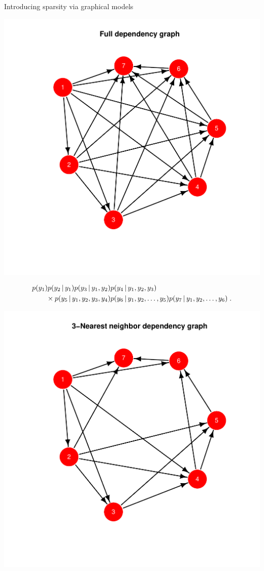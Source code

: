 \begin{frame}{Introducing sparsity via graphical models}
	
	 	{\begin{center}
	\includegraphics[scale=0.35, trim={0 1cm 1cm 2cm}, clip]{../figures/nnfull.pdf}
\end{center}
	{\small
	\begin{align*}
	& p(y_1)p(y_2\,|\, y_1)p(y_3\,|\, y_1,y_2)p(y_4\,|\, y_1,y_2,y_3)\\ 
	&\qquad \times p(y_5\,|\, y_1,y_2,y_3,y_4)p(y_6\,|\, y_1,y_2,\ldots,y_5)  p(y_7\,|\, y_1,y_2,\ldots,y_6)\;. 
	\end{align*}
}}
	 	{\begin{center}
		\includegraphics[scale=0.35, trim={0 1cm 1cm 2cm}, clip]{../figures/nn3.pdf}

\end{center}}
\end{frame}

